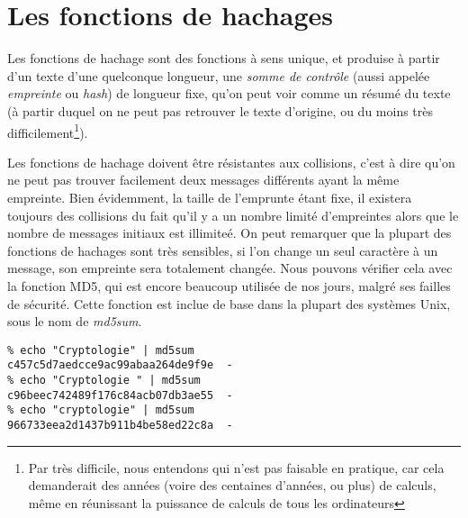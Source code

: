\section{Les fonctions de hachages}
Les fonctions de hachage sont des fonctions à sens unique, et
produise à partir d'un texte d'une quelconque longueur, une 
\emph{somme de contrôle} (aussi appelée \emph{empreinte}
ou \emph{hash}) de longueur fixe, qu'on peut voir comme un résumé
du texte (à partir duquel on ne peut pas retrouver le texte
d'origine, ou du moins très difficilement\footnote{Par très
difficile, nous entendons qui n'est pas faisable en pratique, car
cela demanderait des années (voire des centaines d'années, ou
plus) de calculs, même en réunissant la puissance de calculs de
tous les ordinateurs}).

Les fonctions de hachage doivent être résistantes aux collisions,
c'est à dire qu'on ne peut pas trouver facilement deux messages
différents ayant la même empreinte. Bien évidemment, la taille de
l'emprunte étant fixe, il existera toujours des collisions du fait
qu'il y a un nombre limité d'empreintes alors que le nombre de
messages initiaux est illimiteé.
On peut remarquer que la plupart des fonctions de hachages sont
très sensibles, si l'on change un seul caractère à un message, son
empreinte sera totalement changée. Nous pouvons vérifier cela avec
la fonction MD5, qui est encore beaucoup utilisée de nos jours,
malgré ses failles de sécurité. Cette fonction est inclue de base
dans la plupart des systèmes Unix, sous le nom de \emph{md5sum}.

\lstset{language=bash}
\begin{lstlisting}
% echo "Cryptologie" | md5sum
c457c5d7aedcce9ac99abaa264de9f9e  -
% echo "Cryptologie " | md5sum
c96beec742489f176c84acb07db3ae55  -
% echo "cryptologie" | md5sum
966733eea2d1437b911b4be58ed22c8a  -
\end{lstlisting}

